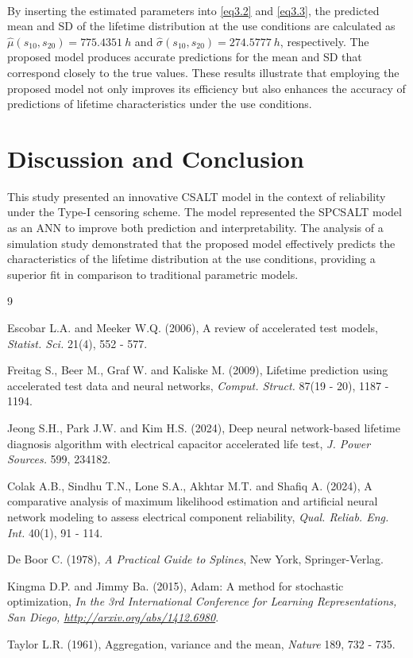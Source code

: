 \documentclass[twoside]{article}
\begin{document}
\\
By inserting the estimated parameters into \eqref{eq3.2} and \eqref{eq3.3}, the predicted mean and SD of the lifetime distribution at the use conditions are
calculated as $\hat{\mu}(s_{10},s_{20}) = 775.4351 \: h$ and $\hat{\sigma}(s_{10},s_{20}) = 274.5777 \: h$, respectively. The proposed model produces accurate predictions for the mean and SD that correspond closely to the true values. These results illustrate that employing the proposed model not only improves its efficiency but also enhances the accuracy of predictions of lifetime characteristics under the use conditions.

\section*{Discussion and Conclusion}   
This study presented an innovative CSALT model in the context of reliability under the Type-I censoring scheme. The model represented the SPCSALT model as an ANN to improve both prediction and interpretability. 
The analysis of a simulation study demonstrated that the proposed model effectively predicts the characteristics of the lifetime distribution at the use conditions, providing a superior fit in comparison to traditional parametric models.

\begin{thebibliography}{9}

Escobar L.A. and Meeker W.Q. (2006), A review of accelerated test models, {\it Statist. Sci.} 21(4), 552 - 577.

Freitag S., Beer M., Graf W. and Kaliske M. (2009), Lifetime prediction using accelerated test data and neural networks, {\it Comput. Struct.} 87(19 - 20), 1187 - 1194.

Jeong S.H., Park J.W. and Kim H.S. (2024), Deep neural network-based lifetime diagnosis algorithm with electrical capacitor accelerated life test, {\it J. Power Sources.} 599, 234182.

Colak A.B., Sindhu T.N., Lone S.A., Akhtar M.T. and Shafiq A. (2024), A comparative analysis of maximum likelihood estimation and artificial neural network modeling to assess electrical component reliability, {\it Qual. Reliab. Eng. Int.} 40(1), 91 - 114.

De Boor C. (1978), {\it A Practical Guide to Splines}, New York, Springer-Verlag.

Kingma D.P. and Jimmy Ba. (2015), Adam: A method for stochastic optimization, {\it In the 3rd International Conference for Learning Representations, San Diego, \url{http://arxiv.org/abs/1412.6980}}.

Taylor L.R. (1961), Aggregation, variance and the mean, {\it Nature} 189, 732 - 735.



\end{thebibliography}
 
\end{document}
